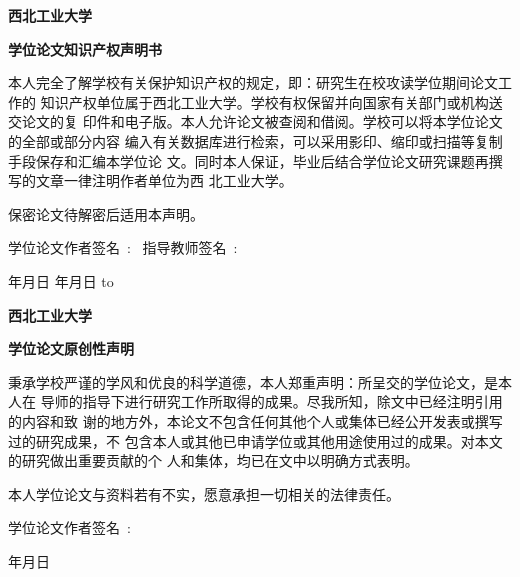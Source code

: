 \begin{titlepage}
    \linespread{1.5}
    \parskip=7pt
    \vspace*{0pt}
    \fSong\sSihao
    \centerline{\bf 西北工业大学}
    \centerline{\bf 学位论文知识产权声明书}
    \fSong\sWuhao
    本人完全了解学校有关保护知识产权的规定，即：研究生在校攻读学位期间论文工作的
    知识产权单位属于西北工业大学。学校有权保留并向国家有关部门或机构送交论文的复
    印件和电子版。本人允许论文被查阅和借阅。学校可以将本学位论文的全部或部分内容
    编入有关数据库进行检索，可以采用影印、缩印或扫描等复制手段保存和汇编本学位论
    文。同时本人保证，毕业后结合学位论文研究课题再撰写的文章一律注明作者单位为西
    北工业大学。
    \par 保密论文待解密后适用本声明。
    \par
    学位论文作者签名{~:~}\underline{\qquad\qquad\qquad} \hfill
    指导教师签名{~:~}\underline{\qquad\qquad\qquad} \par
    \hskip 3cm {年\qquad 月\qquad 日} \hfill\hskip 3cm {年\qquad 月\qquad 日}
    \vspace*{30pt}
    \hbox to 

    \vspace*{50pt}
    \fSong\sSihao
    \centerline{\bf 西北工业大学}
    \centerline{\bf 学位论文原创性声明}
    \fSong\sWuhao
    秉承学校严谨的学风和优良的科学道德，本人郑重声明：所呈交的学位论文，是本人在
    导师的指导下进行研究工作所取得的成果。尽我所知，除文中已经注明引用的内容和致
    谢的地方外，本论文不包含任何其他个人或集体已经公开发表或撰写过的研究成果，不
    包含本人或其他已申请学位或其他用途使用过的成果。对本文的研究做出重要贡献的个
    人和集体，均已在文中以明确方式表明。
    \par 本人学位论文与资料若有不实，愿意承担一切相关的法律责任。
    \par
    \hskip5.5cm
    \hfill 学位论文作者签名{~:~}\underline{\qquad\qquad\qquad}\par
    \hfill\hskip8.5cm {年\qquad 月\qquad 日}
\end{titlepage}
\endinput
